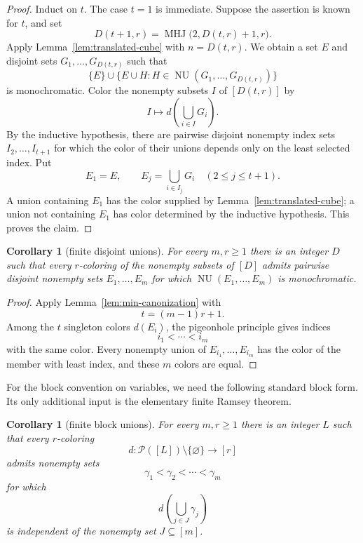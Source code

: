 \documentclass[11pt]{article}
\newtheorem{corollary}[theorem]{Corollary}
\theoremstyle{remark}
\newcommand{\cP}{\mathcal P}
\newcommand{\NU}{\operatorname{NU}}
\newcommand{\MHJ}{\operatorname{MHJ}}
\begin{document}
\begin{proof}
Induct on $t$. The case $t=1$ is immediate. Suppose the assertion is known
for $t$, and set
\[
  D(t+1,r)=\MHJ\bigl(2,D(t,r)+1,r\bigr).
\]
Apply Lemma~\ref{lem:translated-cube} with $n=D(t,r)$. We obtain a set $E$
and disjoint sets $G_1,\dots,G_{D(t,r)}$ such that
\[
  \{E\}\cup\{E\cup H:H\in\NU(G_1,\dots,G_{D(t,r)})\}
\]
is monochromatic. Color the nonempty subsets $I$ of $[D(t,r)]$ by
\[
  I\longmapsto d\left(\bigcup_{i\in I}G_i\right).
\]
By the inductive hypothesis, there are pairwise disjoint nonempty index
sets $I_2,\dots,I_{t+1}$ for which the color of their unions depends only on
the least selected index. Put
\[
  E_1=E,
  \qquad
  E_j=\bigcup_{i\in I_j}G_i\quad(2\le j\le t+1).
\]
A union containing $E_1$ has the color supplied by
Lemma~\ref{lem:translated-cube}; a union not containing $E_1$ has color
determined by the inductive hypothesis. This proves the claim.
\end{proof}

\begin{corollary}[finite disjoint unions]\label{cor:disjoint-unions}
For every $m,r\ge1$ there is an integer $D$ such that every $r$-coloring of
the nonempty subsets of $[D]$ admits pairwise disjoint nonempty sets
$E_1,\dots,E_m$ for which $\NU(E_1,\dots,E_m)$ is monochromatic.
\end{corollary}

\begin{proof}
Apply Lemma~\ref{lem:min-canonization} with
\[
  t=(m-1)r+1.
\]
Among the $t$ singleton colors $d(E_i)$, the pigeonhole principle gives
indices
\[
  i_1<\cdots<i_m
\]
with the same color. Every nonempty union of
$E_{i_1},\dots,E_{i_m}$ has the color of the member with least index, and
these $m$ colors are equal.
\end{proof}

For the block convention on variables, we need the following standard
block form. Its only additional input is the elementary finite Ramsey
theorem.

\begin{corollary}[finite block unions]\label{cor:block-unions}
For every $m,r\ge1$ there is an integer $L$ such that every $r$-coloring
\[
  d:\cP([L])\setminus\{\varnothing\}\longrightarrow[r]
\]
admits nonempty sets
\[
  \gamma_1<\gamma_2<\cdots<\gamma_m
\]
for which
\[
  d\left(\bigcup_{j\in J}\gamma_j\right)
\]
is independent of the nonempty set $J\subseteq[m]$.
\end{corollary}
\end{document}
